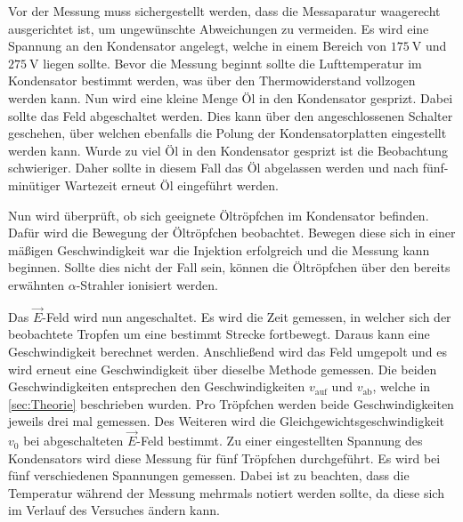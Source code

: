 Vor der Messung muss sichergestellt werden, dass die Messaparatur waagerecht ausgerichtet ist, um ungewünschte Abweichungen zu vermeiden. Es 
wird eine Spannung an den Kondensator angelegt, welche in einem Bereich von $\qty{175}{\volt}$ und $\qty{275}{\volt}$ liegen sollte. Bevor die Messung beginnt sollte die 
Lufttemperatur im Kondensator bestimmt werden, was über den Thermowiderstand vollzogen werden kann. Nun wird eine kleine Menge Öl in den Kondensator gesprizt. 
Dabei sollte das Feld abgeschaltet werden. Dies kann über den 
angeschlossenen Schalter geschehen, über welchen ebenfalls die Polung der Kondensatorplatten eingestellt werden kann. Wurde zu viel Öl in den Kondensator gesprizt ist die Beobachtung 
schwieriger. Daher sollte in diesem Fall das Öl abgelassen werden und nach fünf-minütiger Wartezeit erneut Öl eingeführt werden. 

Nun wird überprüft, ob sich geeignete Öltröpfchen im Kondensator befinden. Dafür wird die Bewegung der Öltröpfchen beobachtet. Bewegen diese sich in einer mäßigen 
Geschwindigkeit war die Injektion erfolgreich und die Messung kann beginnen. Sollte dies nicht der Fall sein, können die Öltröpfchen über den bereits erwähnten 
$\alpha$-Strahler ionisiert werden.

Das $\vec{E}$-Feld wird nun angeschaltet. Es wird die Zeit gemessen, in welcher sich der beobachtete Tropfen um eine bestimmt Strecke fortbewegt. Daraus kann eine Geschwindigkeit
berechnet werden. Anschließend wird das Feld umgepolt und es wird erneut eine Geschwindigkeit über dieselbe Methode gemessen. Die beiden Geschwindigkeiten entsprechen den 
Geschwindigkeiten $v_\text{auf}$ und $v_\text{ab}$, welche in \autoref{sec:Theorie} beschrieben wurden. 
Pro Tröpfchen werden beide Geschwindigkeiten jeweils drei mal gemessen. Des Weiteren wird die Gleichgewichtsgeschwindigkeit $v_0$ bei abgeschalteten 
$\vec{E}$-Feld bestimmt. Zu einer eingestellten Spannung des Kondensators wird diese Messung für fünf Tröpfchen durchgeführt. 
Es wird bei fünf verschiedenen Spannungen gemessen. Dabei ist zu beachten, dass die Temperatur während der Messung mehrmals notiert werden sollte, da diese sich im Verlauf
des Versuches ändern kann.
